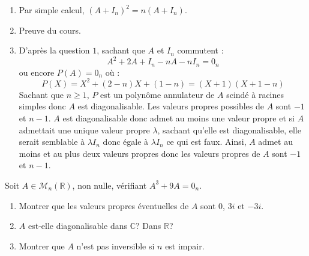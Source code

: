 \documentclass[a4paper,10pt]{report}
\begin{document}
\corr 
\begin{enumerate}
\item Par simple calcul, $(A+I_n)^2 = n (A+I_n)$.
\item Preuve du cours.
\item D'après la question $1$, sachant que $A$ et $I_n$ commutent :
$$ A^2 +2A+I_n -nA-nI_n=0_n$$
ou encore $P(A)=0_n$ où :
$$ P(X)=X^2+(2-n)X+(1-n) = (X+1)(X+1-n)$$
Sachant que $n \geq 1$, $P$ est un polynôme annulateur de $A$ scindé à racines simples donc $A$ est diagonalisable. Les valeurs propres possibles de $A$ sont $-1$ et $n-1$. $A$ est diagonalisable donc admet au moins une valeur propre et si $A$ admettait une unique valeur propre $\lambda$, sachant qu'elle est diagonalisable, elle serait semblable à $\lambda I_n$ donc égale à $\lambda I_n$ ce qui est faux. Ainsi, $A$ admet au moins et au plus deux valeurs propres donc les valeurs propres de $A$ sont $-1$ et $n-1$.
\end{enumerate}

\begin{Exercice}{} Soit $A \in \mathcal{M}_n(\mathbb{R})$, non nulle, vérifiant $A^3+9A=0_n$.
\begin{enumerate}
\item Montrer que les valeurs propres éventuelles de $A$ sont $0$, $3i$ et $-3i$.
\item $A$ est-elle diagonalisable dans $\mathbb{C}$? Dans $\mathbb{R}$?
\item Montrer que $A$ n'est pas inversible si $n$ est impair. 
\end{enumerate}
\end{Exercice}
\end{document}
